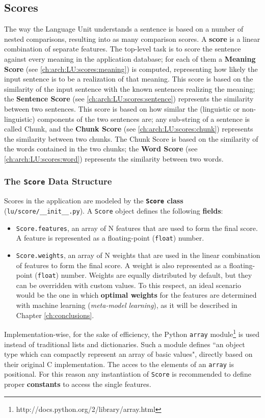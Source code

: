 \subsection{Scores} \label{ch:arch:LU:scores}
The way the Language Unit understands a sentence is based on a number of nested comparisons, resulting into as many comparison scores. A \textbf{score} is a linear combination of separate features. The top-level task is to score the sentence against every meaning in the application database; for each of them a \textbf{Meaning Score} (see \ref{ch:arch:LU:scores:meaning}) is computed, representing how likely the input sentence is to be a realization of that meaning. This score is based on the similarity of the input sentence with the known sentences realizing the meaning; the \textbf{Sentence Score} (see \ref{ch:arch:LU:scores:sentence}) represents the similarity between two sentences. This score is based on how similar the (linguistic or non-linguistic) components of the two sentences are; any sub-string of a sentence is called Chunk, and the \textbf{Chunk Score} (see \ref{ch:arch:LU:scores:chunk}) represents the similarity between two chunks. The Chunk Score is based on the similarity of the words contained in the two chunks; the \textbf{Word Score} (see \ref{ch:arch:LU:scores:word}) represents the similarity between two words.

\subsubsection{The \texttt{Score} Data Structure}
Scores in the application are modeled by the \textbf{\texttt{Score} class} (\texttt{lu/score/\_\_init\_\_.py}). A \texttt{Score} object defines the following \textbf{fields}:
\begin{itemize}
	\item \texttt{Score.features}, an array of N features that are used to form the final score. A feature is represented as a floating-point (\texttt{float}) number.
	\item \texttt{Score.weights}, an array of N weights that are used in the linear combination of features to form the final score. A weight is also represented as a floating-point (\texttt{float}) number. Weights are equally distributed by default, but they can be overridden with custom values. To this respect, an ideal scenario would be the one in which \textbf{optimal weights} for the features are determined with machine learning (\emph{meta-model learning}), as it will be described in Chapter \ref{ch:conclusions}. %
\end{itemize}
Implementation-wise, for the sake of efficiency, the Python \texttt{array} module\footnote{http://docs.python.org/2/library/array.html} is used instead of traditional lists and dictionaries. Such a module defines ``an object type which can compactly represent an array of basic values", directly based on their original C implementation. The acces to the elements of an \texttt{array} is positional. For this reason any instantiation of \texttt{Score} is recommended to define proper \textbf{constants} to access the single features.


